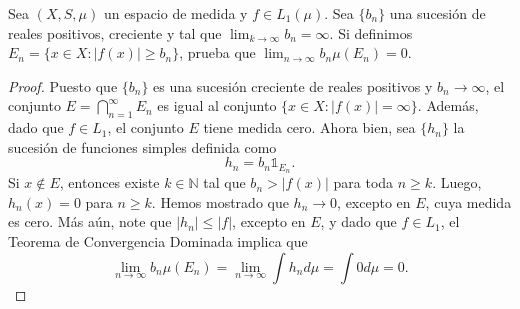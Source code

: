 \documentclass[12pt]{article}
\newcommand{\N}{\mathbb{N}}
\newenvironment{problem}[2][Problema]{\begin{trivlist}
\item[\hskip \labelsep {\bfseries #1}\hskip \labelsep {\bfseries #2.}]}{\end{trivlist}}
\begin{document}
\begin{problem}{19} Sea $(X, S, \mu)$ un espacio de medida y $f \in L_1(\mu)$. Sea $\{b_n\}$ una sucesión de reales positivos, creciente y tal que $\lim_{k\to \infty} b_n = \infty.$ Si definimos $E_n  = \{x \in X: \lvert f(x) \rvert \geq b_n \}$, prueba que $\lim_{n\to \infty} b_n \mu(E_n) = 0.$
\end{problem}
\begin{comment}
\begin{proof} En primer lugar, observe que 
$$ E = \bigcap_{n=1}^\infty E_n = \{x \in X: \lvert f(x) \rvert = \infty \},$$
puesto que la sucesión $\{b_n\}$ es creciente y $\lim_{n\to \infty} b_n = \infty.$ El hecho de que $f \in L_1(\mu)$, implica que
$$\mu(E) \cdot \infty = \mu(E) \cdot \inf_E \lvert f \rvert \leq \int_E \lvert f \rvert d \mu  \leq \parallel f \parallel_1 < \infty$$
y esto se satisface si y solo si $\mu(E) = 0.$
%

Por otro lado, sea $\{g_n\}$ la sucesión de funciones medibles definida como $g_n = b_n\cdot \mathbb{1}_{E_n}$. Note que $\{g_n\}$ converge a la función medible
$$
g(x) = \begin{cases}
    \infty & \text{ si } x \in E\\
    0 & \text{ de otro modo.}
\end{cases}
$$
Además, $\lvert g_n \rvert  \leq  \lvert f \rvert$ para toda $n\in \N$. Dado que $f \in L_1(\mu)$, por el Teorema de Convergencia Dominada, se obtiene que 
$$ \lim_{n \to \infty} b_n \mu(E_n) = \lim_{n\to \infty} \int g_n d \mu = \int g d\mu = 0.$$
\end{proof}
\end{comment}
\begin{proof}
Puesto que $\{b_n\}$ es una sucesión creciente de reales positivos y $b_n \to \infty$, el conjunto $E = \bigcap_{n=1}^\infty E_n $ es igual al conjunto $ \{x \in X: \lvert f(x) \rvert = \infty \}.$ Además, dado que $f \in L_1$, el conjunto $E$ tiene medida cero. Ahora bien, sea  $\{h_n\}$ la sucesión de funciones simples definida como 
$$h_n = b_n \mathbb{1}_{E_n}.$$
Si $x \notin E$, entonces existe $k \in \N$ tal que $b_n > \lvert f(x) \rvert$ para toda $n \geq k.$ Luego, $h_n(x) = 0$ para $n \geq k.$ Hemos mostrado que $h_n \to 0$, excepto en $E$, cuya medida es cero. Más aún, note que $\lvert h_n \rvert \leq \lvert f \rvert$, excepto en $E$, y dado que $f \in L_1$, el Teorema de Convergencia Dominada implica que 
$$\lim_{n \to \infty} b_n \mu(E_n) =\lim_{n \to \infty} \int h_n d \mu = \int 0 d \mu = 0.$$
\end{proof}
\end{document}
